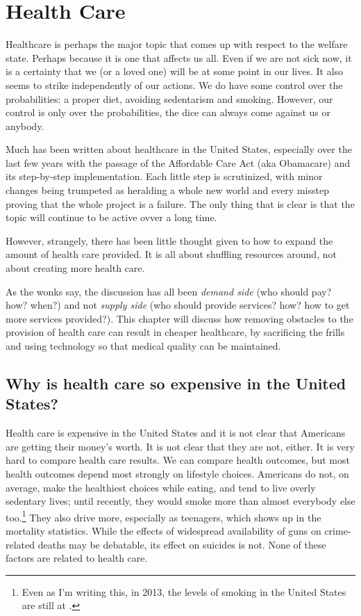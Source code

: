 \chapter{Health Care}
\label{chpt:health}

Healthcare is perhaps the major topic that comes up with respect to the welfare
state. Perhaps because it is one that affects us all. Even if we are not sick
now, it is a certainty that we (or a loved one) will be at some point in our
lives. It also seems to strike independently of our actions. We do have some
control over the probabilities: a proper diet, avoiding sedentarism and
smoking. However, our control is only over the probabilities, the dice can
always come against us or anybody.

Much has been written about healthcare in the United States, especially over
the last few years with the passage of the Affordable Care Act (aka Obamacare)
and its step-by-step implementation. Each little step is scrutinized, with
minor changes being trumpeted as heralding a whole new world and every misstep
proving that the whole project is a failure. The only thing that is clear is
that the topic will continue to be active ovver a long time.

However, strangely, there has been little thought given to how to expand the
amount of health care provided. It is all about shuffling resources around, not
about creating more health care.

As the wonks say, the discussion has all been \emph{demand side} (who should
pay? how? when?) and not \emph{supply side} (who should provide services? how?
how to get more services provided?). This chapter will discuss how removing
obstacles to the provision of health care can result in cheaper healthcare, by
sacrificing the frills and using technology so that medical quality can be
maintained.

\section{Why is health care so expensive in the United States?}

Health care is expensive in the United States and it is not clear that
Americans are getting their money's worth. It is not clear that they are not,
either. It is very hard to compare health care results. We can compare health
outcomes, but most health outcomes depend most strongly on lifestyle choices.
Americans do not, on average, make the healthiest choices while eating, and
tend to live overly sedentary lives; until recently, they would smoke more than
almost everybody else too.\footnote{Even as I'm writing this, in 2013, the
levels of smoking in the United States are still at \FIXME.} They also drive
more, especially as teenagers, which shows up in the mortality statistics.
While the effects of widespread availability of guns on crime-related deaths
may be debatable, its effect on suicides is not. None of these factors are
related to health care.

